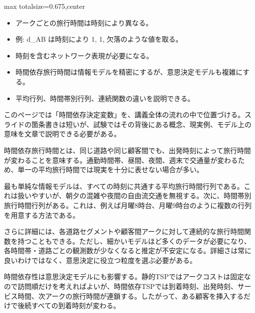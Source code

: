 \clearpage
{}
\begin{adjustbox}{max totalsize={\textwidth}{0.675\textheight},center}
\begin{minipage}{\textwidth}\scriptsize
\begin{minipage}[t]{0.485\textwidth}
\begin{itemize}
\item アークごとの旅行時間は時刻により異なる。
\item 例: d\_AB は時刻により 1, 1, 欠落のような値を取る。
\item 時刻を含むネットワーク表現が必要になる。
\end{itemize}
\begin{itemize}
\item 時間依存旅行時間は情報モデルを精密にするが、意思決定モデルも複雑にする。
\item 平均行列、時間帯別行列、連続関数の違いを説明できる。
\end{itemize}
\end{minipage}\hfill
\begin{minipage}[t]{0.485\textwidth}
このページでは「時間依存決定変数」を、講義全体の流れの中で位置づける。スライドの箇条書きは短いが、試験ではその背後にある概念、現実例、モデル上の意味を文章で説明できる必要がある。\par
時間依存旅行時間とは、同じ道路や同じ顧客間でも、出発時刻によって旅行時間が変わることを意味する。通勤時間帯、昼間、夜間、週末で交通量が変わるため、単一の平均旅行時間では現実を十分に表せない場合が多い。\par
最も単純な情報モデルは、すべての時刻に共通する平均旅行時間行列である。これは扱いやすいが、朝夕の混雑や夜間の自由流交通を無視する。次に、時間帯別旅行時間行列がある。これは、例えば月曜8時台、月曜9時台のように複数の行列を用意する方法である。\par
さらに詳細には、各道路セグメントや顧客間アークに対して連続的な旅行時間関数を持つこともできる。ただし、細かいモデルほど多くのデータが必要になり、各時間帯・道路ごとの観測数が少なくなると推定が不安定になる。詳細さは常に良いわけではなく、意思決定に役立つ粒度を選ぶ必要がある。\par
時間依存性は意思決定モデルにも影響する。静的TSPではアークコストは固定なので訪問順だけを考えればよいが、時間依存TSPでは到着時刻、出発時刻、サービス時間、次アークの旅行時間が連鎖する。したがって、ある顧客を挿入するだけで後続すべての到着時刻が変わる。\par

\end{minipage}
\end{minipage}
\end{adjustbox}

